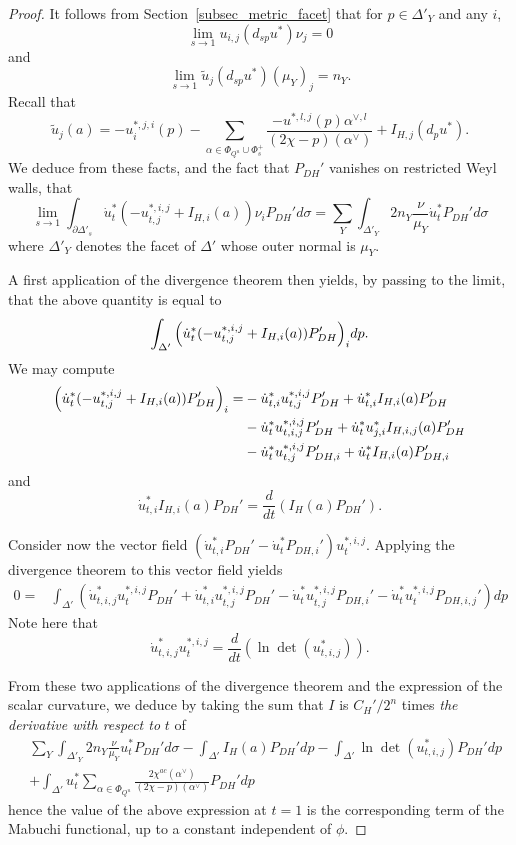\documentclass{amsart}
\theoremstyle{definition}
\begin{document}
\begin{proof}
It follows from Section~\ref{subsec_metric_facet} 
that for $p\in \Delta'_Y$ and any $i$,
\[
\lim_{s\rightarrow 1} u_{i,j}(d_{sp}u^*)\nu_j = 0 
\] 
and 
\[
\lim_{s\rightarrow 1} \tilde{u}_{j}(d_{sp}u^*)(\mu_Y)_j = n_Y. 
\]
Recall that 
\[
\tilde{u}_j(a)=-u^{*,j,i}_i(p)
-\sum_{\alpha\in\Phi_{Q^u}\cup\Phi_s^+}\frac{-u^{*,l,j}(p)\alpha^{\vee,l}}{(2\chi-p)(\alpha^{\vee})}
+I_{H,j}(d_pu^*).
\]
We deduce from these facts, and the fact that $P_{DH}'$ vanishes 
on restricted Weyl walls, that 
\[
\lim_{s\rightarrow 1}
\int_{\partial \Delta'_{s}} \dot{u}_t^*
(-u^{*,i,j}_{t,j}+I_{H,i}(a))\nu_iP_{DH}'d\sigma
= \sum_Y \int_{\Delta'_Y} 2n_Y \frac{\nu}{\mu_Y} \dot{u}_t^*P_{DH}'d\sigma
\]
where $\Delta'_Y$ denotes the facet of $\Delta'$ whose outer normal is 
$\mu_Y$.
 
A first application of the divergence theorem then yields, by passing to the limit, 
that the above quantity is equal to 
\[
\int_{\Delta'}\Big{(}\dot{u}_t^*(-u_{t,j}^{*,i,j}+I_{H,i}(a))P_{DH}'\Big{)}_idp.
\]
We may compute 
\begin{align*}
\Big{(}\dot{u}_t^*(-u_{t,j}^{*,i,j}+I_{H,i}(a))P_{DH}'\Big{)}_i = &
-\dot{u}^*_{t,i}u^{*,i,j}_{t,j}P_{DH}'
+\dot{u}^*_{t,i}I_{H,i}(a)P_{DH}'
 \\ &
-\dot{u}^*_{t}u^{*,i,j}_{t,i,j}P_{DH}'
+\dot{u}^*_{t}u^*_{j,i}I_{H,i,j}(a)P_{DH}'
 \\ &
-\dot{u}^*_{t}u^{*,i,j}_{t,j}P_{DH,i}'
+\dot{u}^*_{t}I_{H,i}(a)P_{DH,i}'
\end{align*}
and 
\[
\dot{u}^*_{t,i}I_{H,i}(a)P_{DH}'=\frac{d}{dt}(I_H(a)P_{DH}').
\]

Consider now the vector field 
$(\dot{u}_{t,i}^*P_{DH}'-\dot{u}_t^*P_{DH,i}')u_t^{*,i,j}$. 
Applying the divergence theorem to this vector field yields 
\begin{align*}
0=& 
\int_{\Delta'} (
\dot{u}^*_{t,i,j}u_t^{*,i,j}P_{DH}'
+\dot{u}^*_{t,i}u_{t,j}^{*,i,j}P_{DH}'
-\dot{u}^*_{t}u_{t,j}^{*,i,j}P_{DH,i}'
-\dot{u}^*_{t}u_t^{*,i,j}P_{DH,i,j}'
)dp
\end{align*}
Note here that 
\[
\dot{u}^*_{t,i,j}u_t^{*,i,j}=\frac{d}{dt}(\ln \det (u^*_{t,i,j})).
\]

From these two applications of the divergence theorem and the expression 
of the scalar curvature, we deduce by taking the sum that $I$ is $C_H'/2^n$ times 
\emph{the derivative with respect to} $t$ of 
\begin{align*}
& \sum_Y \int_{\Delta'_Y} 2n_Y \frac{\nu}{\mu_Y} u_t^*P_{DH}'d\sigma
-\int_{\Delta'} I_H(a)P_{DH}'dp
-\int_{\Delta'} \ln \det (u^*_{t,i,j})P_{DH}'dp \\ &
+\int_{\Delta'} u_t^* \sum_{\alpha\in \Phi_{Q^u}}\frac{2\chi^{ac}(\alpha^{\vee})}{(2\chi-p)(\alpha^{\vee})}P_{DH}'dp
\end{align*}
hence the value of the above expression at $t=1$ is the corresponding term of the Mabuchi 
functional, up to a constant independent of $\phi$. 


\end{proof}
\end{document}
